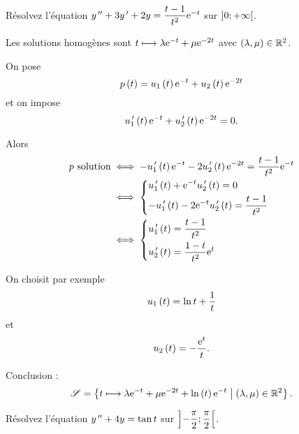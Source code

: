 \begin{exo}
Résolvez l'équation \(y^{\,\prime\prime}+3y^{\,\prime}+2y=\dfrac{t-1}{t^2}\mathrm{e}^{-t}\) sur \(\left]0;+\infty\right[\).
\end{exo}

\begin{corr}
Les solutions homogènes sont \(t\longmapsto\lambda\mathrm{e}^{-t}+\mu\mathrm{e}^{-2t}\) avec \(\left(\lambda,\mu\right)\in\mathbb{R}^2\).

On pose \[p\left(t\right)=u_1\left(t\right)\mathrm{e}^{-t}+u_2\left(t\right)\mathrm{e}^{-2t}\] et on impose \[u_1^{\,\prime}\left(t\right)\mathrm{e}^{-t}+u_2^{\,\prime}\left(t\right)\mathrm{e}^{-2t}=0.\]

Alors \[\begin{aligned}
p\text{ solution}&\iff-u_1^{\,\prime}\left(t\right)\mathrm{e}^{-t}-2u_2^{\,\prime}\left(t\right)\mathrm{e}^{-2t}=\dfrac{t-1}{t^2}\mathrm{e}^{-t} \\
&\iff\begin{dcases}
u_1^{\,\prime}\left(t\right)+\mathrm{e}^{-t}u_2^{\,\prime}\left(t\right)=0 \\
-u_1^{\,\prime}\left(t\right)-2\mathrm{e}^{-t}u_2^{\,\prime}\left(t\right)=\dfrac{t-1}{t^2}
\end{dcases} \\
&\iff\begin{dcases}
u_1^{\,\prime}\left(t\right)=\dfrac{t-1}{t^2} \\
u_2^{\,\prime}\left(t\right)=\dfrac{1-t}{t^2}\mathrm{e}^{t}
\end{dcases}
\end{aligned}\]

On choisit par exemple \[u_1\left(t\right)=\ln t+\dfrac{1}{t}\] et \[u_2\left(t\right)=-\dfrac{\mathrm{e}^{t}}{t}.\]

Conclusion : \[\mathscr{S}=\left\lbrace t\longmapsto\lambda\mathrm{e}^{-t}+\mu\mathrm{e}^{-2t}+\ln\left(t\right)\mathrm{e}^{-t}\;\middle|\;\left(\lambda,\mu\right)\in\mathbb{R}^2\right\rbrace.\]
\end{corr}

\begin{exo}
Résolvez l'équation \(y^{\,\prime\prime}+4y=\tan t\) sur \(\left]-\dfrac{\pi}{2};\dfrac{\pi}{2}\right[\).
\end{exo}

